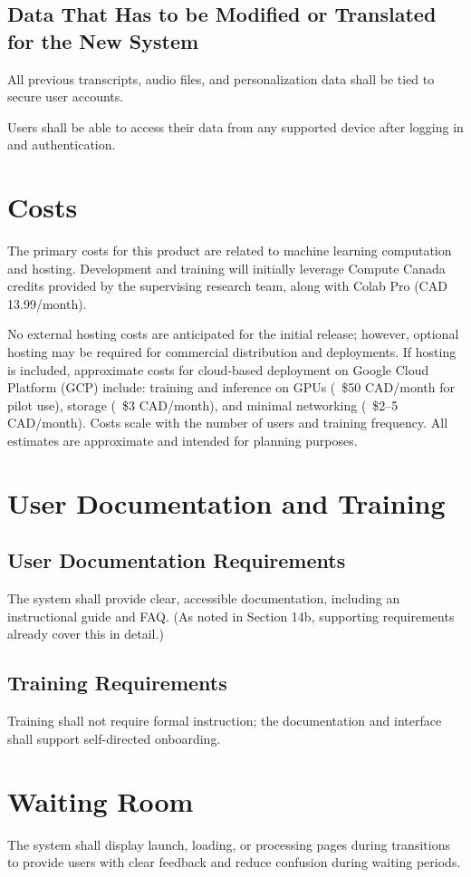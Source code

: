 \documentclass[11pt]{article}
\begin{document}
\subsection{Data That Has to be Modified or Translated for the New System}
All previous transcripts, audio files, and personalization data shall be tied to secure user accounts.

Users shall be able to access their data from any supported device after logging in and authentication.

\section{Costs}
The primary costs for this product are related to machine learning computation and hosting. Development and training will initially leverage Compute Canada credits provided by the supervising research team, along with Colab Pro (CAD 13.99/month).

No external hosting costs are anticipated for the initial release; however, optional hosting may be required for commercial distribution and deployments. If hosting is included, approximate costs for cloud-based deployment on Google Cloud Platform (GCP) include: training and inference on GPUs (~\$50 CAD/month for pilot use), storage (~\$3 CAD/month), and minimal networking (~\$2–5 CAD/month). Costs scale with the number of users and training frequency. All estimates are approximate and intended for planning purposes.
\section{User Documentation and Training}
\subsection{User Documentation Requirements}
The system shall provide clear, accessible documentation, including an instructional guide and FAQ. (As noted in Section 14b, supporting requirements already cover this in detail.)

\subsection{Training Requirements}
Training shall not require formal instruction; the documentation and interface shall support self-directed onboarding.

\section{Waiting Room}
The system shall display launch, loading, or processing pages during transitions to provide users with clear feedback and reduce confusion during waiting periods.
\end{document}
